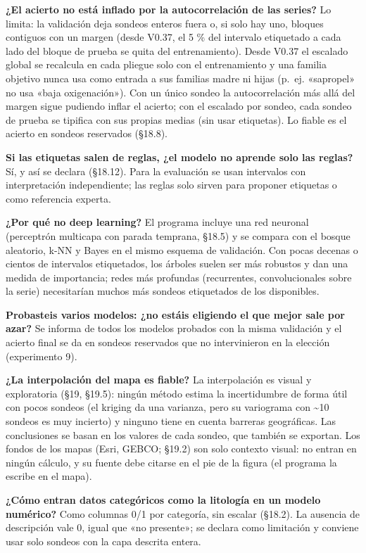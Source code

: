 \documentclass[
  10pt,
]{article}
\begin{document}
\textbf{¿El acierto no está inflado por la autocorrelación de las
series?} Lo limita: la validación deja sondeos enteros fuera o, si solo
hay uno, bloques contiguos con un margen (desde V0.37, el 5 \% del
intervalo etiquetado a cada lado del bloque de prueba se quita del
entrenamiento). Desde V0.37 el escalado global se recalcula en cada
pliegue solo con el entrenamiento y una familia objetivo nunca usa como
entrada a sus familias madre ni hijas (p.~ej. «sapropel» no usa «baja
oxigenación»). Con un único sondeo la autocorrelación más allá del
margen sigue pudiendo inflar el acierto; con el escalado por sondeo,
cada sondeo de prueba se tipifica con sus propias medias (sin usar
etiquetas). Lo fiable es el acierto en sondeos reservados (§18.8).

\textbf{Si las etiquetas salen de reglas, ¿el modelo no aprende solo las
reglas?} Sí, y así se declara (§18.12). Para la evaluación se usan
intervalos con interpretación independiente; las reglas solo sirven para
proponer etiquetas o como referencia experta.

\textbf{¿Por qué no deep learning?} El programa incluye una red neuronal
(perceptrón multicapa con parada temprana, §18.5) y se compara con el
bosque aleatorio, k-NN y Bayes en el mismo esquema de validación. Con
pocas decenas o cientos de intervalos etiquetados, los árboles suelen
ser más robustos y dan una medida de importancia; redes más profundas
(recurrentes, convolucionales sobre la serie) necesitarían muchos más
sondeos etiquetados de los disponibles.

\textbf{Probasteis varios modelos: ¿no estáis eligiendo el que mejor
sale por azar?} Se informa de todos los modelos probados con la misma
validación y el acierto final se da en sondeos reservados que no
intervinieron en la elección (experimento 9).

\textbf{¿La interpolación del mapa es fiable?} La interpolación es
visual y exploratoria (§19, §19.5): ningún método estima la
incertidumbre de forma útil con pocos sondeos (el kriging da una
varianza, pero su variograma con \textasciitilde10 sondeos es muy
incierto) y ninguno tiene en cuenta barreras geográficas. Las
conclusiones se basan en los valores de cada sondeo, que también se
exportan. Los fondos de los mapas (Esri, GEBCO; §19.2) son solo contexto
visual: no entran en ningún cálculo, y su fuente debe citarse en el pie
de la figura (el programa la escribe en el mapa).

\textbf{¿Cómo entran datos categóricos como la litología en un modelo
numérico?} Como columnas 0/1 por categoría, sin escalar (§18.2). La
ausencia de descripción vale 0, igual que «no presente»; se declara como
limitación y conviene usar solo sondeos con la capa descrita entera.
\end{document}
